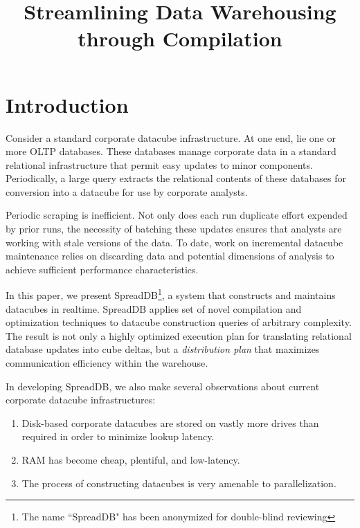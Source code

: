 \documentclass{sig-alternate}
\title{Streamlining Data Warehousing through Compilation}
\author{}%
\begin{document}
\maketitle

\section{Introduction}

Consider a standard corporate datacube infrastructure.  At one end, lie one or more OLTP databases.  These databases manage corporate data in a standard relational infrastructure that permit easy updates to minor components.  Periodically, a large query extracts the relational contents of these databases for conversion into a datacube for use by corporate analysts.  

Periodic scraping is inefficient.  Not only does each run duplicate effort expended by prior runs, the necessity of batching these updates ensures that analysts are working with stale versions of the data.  To date, work on incremental datacube maintenance relies on discarding data and potential dimensions of analysis to achieve sufficient performance characteristics.  

In this paper, we present SpreadDB\footnote{The name ``SpreadDB" has been anonymized for double-blind reviewing}, a system that constructs and maintains datacubes in realtime.  SpreadDB applies set of novel compilation and optimization techniques to datacube construction queries of arbitrary complexity.  The result is not only a highly optimized execution plan for translating relational database updates into cube deltas, but a \textit{distribution plan} that maximizes communication efficiency within the warehouse.

In developing SpreadDB, we also make several observations about current corporate datacube infrastructures:
\begin{enumerate}
\item Disk-based corporate datacubes are stored on vastly more drives than required in order to minimize lookup latency.
\item RAM has become cheap, plentiful, and low-latency.
\item The process of constructing datacubes is very amenable to parallelization.
\end{enumerate}
\end{document}
